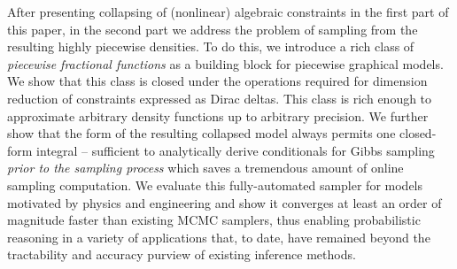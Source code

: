 \documentclass[letterpaper]{article}
\begin{document}
After presenting collapsing of (nonlinear) algebraic constraints in the first part of this paper, in the second part we address the problem of sampling from the resulting highly piecewise densities.
To do this, we introduce a rich class of \emph{piecewise fractional functions} as a building block for piecewise graphical models.
We show that this class is closed under the operations required for dimension reduction of constraints expressed as Dirac deltas. 
This class is rich enough to approximate arbitrary density functions up to arbitrary precision. 
We further show that the form of the resulting collapsed model always permits one closed-form integral -- sufficient to analytically derive conditionals for Gibbs sampling \emph{prior to the sampling process} which saves a tremendous amount of online sampling computation.
We evaluate this fully-automated sampler for models motivated by physics and engineering and show it converges at least an order of magnitude faster than existing MCMC samplers, thus enabling probabilistic reasoning in a variety of applications that, to date, have remained beyond the tractability and accuracy purview of existing inference methods.  


\end{document}
